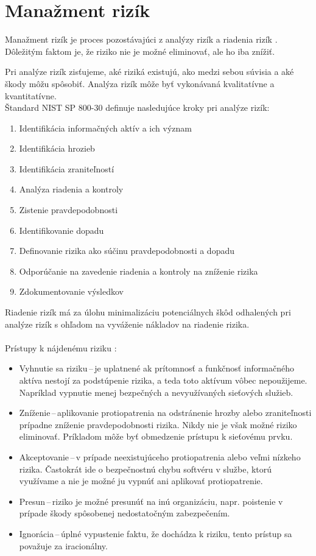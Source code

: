 \section{Manažment rizík}
Manažment rizík je proces pozostávajúci z analýzy rizík a riadenia rizík \cite{McMillan2018}. Dôležitým faktom je, že riziko nie je možné eliminovať, ale ho iba znížiť.

Pri analýze rizík zisťujeme, aké riziká existujú, ako medzi sebou súvisia a aké škody môžu spôsobiť. Analýza rizík môže byť vykonávaná kvalitatívne a kvantitatívne.\\ 
\newpage
\noindent
Štandard NIST SP 800-30 \cite{7TVhmfuQFbsOANAz} definuje nasledujúce kroky pri analýze rizík:

\begin{enumerate}
	\item Identifikácia informačných aktív a ich význam
	\item Identifikácia hrozieb
	\item Identifikácia zraniteľností
	\item Analýza riadenia a kontroly 
	\item Zistenie pravdepodobnosti
	\item Identifikovanie dopadu
	\item Definovanie rizika ako súčinu pravdepodobnosti a dopadu
	\item Odporúčanie na zavedenie riadenia a kontroly na zníženie rizika  
	\item Zdokumentovanie výsledkov
\end{enumerate} 
\vspace{2em}
Riadenie rizík má za úlohu minimalizáciu potenciálnych škôd odhalených pri analýze rizík s ohľadom na vyváženie nákladov na riadenie rizika. 
\\\\
\noindent
Prístupy k nájdenému riziku \cite{Vyncke2008}\cite{McMillan2018}\cite{Jackson2010}:
\begin{itemize}
	\item Vyhnutie sa riziku\,--\,je uplatnené ak prítomnosť a funkčnosť informačného aktíva nestojí za podstúpenie rizika, a teda toto aktívum vôbec nepoužijeme. Napríklad vypnutie menej bezpečných a nevyužívaných sieťových služieb.  
	
	\item Zníženie\,--\,aplikovanie protiopatrenia na odstránenie hrozby alebo zraniteľnosti prípadne zníženie pravdepodobnosti rizika. Nikdy nie je však možné riziko eliminovať. Príkladom môže byť obmedzenie prístupu k sieťovému prvku.
	
	\item Akceptovanie\,--\,v prípade neexistujúceho protiopatrenia alebo veľmi nízkeho rizika. Častokrát ide o bezpečnostnú chybu softvéru v službe, ktorú využívame a nie je možné ju vypnúť ani aplikovať protiopatrenie.
	
	\item Presun\,--\,riziko je možné presunúť na inú organizáciu, napr. poistenie v prípade škody spôsobenej nedostatočným zabezpečením.
	
	\item Ignorácia\,--\,úplné vypustenie faktu, že dochádza k riziku, tento prístup sa považuje za iracionálny.
\end{itemize}

